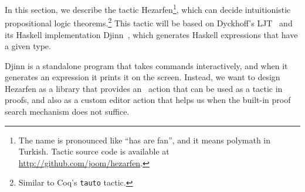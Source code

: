 In this section, we describe the tactic Hezarfen\footnote{ The name is
  pronounced like ``has are fan'', and it means
    polymath in Turkish.  Tactic source code is available at
    \url{http://github.com/joom/hezarfen}.}, which can decide intuitionistic
propositional logic theorems.\footnote{Similar to Coq's \texttt{tauto} tactic.}
This tactic will be based on Dyckhoff's LJT~\cite{ljt} and its Haskell
implementation Djinn~\cite{djinn}, which generates Haskell expressions
that have a given type.

Djinn is a standalone program that takes commands
interactively, and when it generates an expression it prints it on the screen.
Instead, we want to design Hezarfen as a library that provides an \Elab\ action
that can be used as a tactic in proofs, and also as a custom editor action that
helps us when the built-in proof search mechanism does not suffice.







